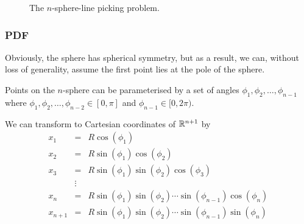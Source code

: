 \begin{figure}[tbp]
  \begin{center}
    \hspace{6mm}
    \caption{The $n$-sphere-line picking problem.}
  \end{center} 
\vspace{-4mm}
\end{figure}

\subsubsection{PDF}

Obviously, the sphere has spherical symmetry, but as a result, we can,
without loss of generality, assume the first point lies at the pole of
the sphere.

Points on the $n$-sphere can be parameterised by a set of angles
$\phi_1, \phi_2, \ldots, \phi_{n-1}$ where $\phi_1, \phi_2, \ldots,
\phi_{n-2}\in [0,\pi]$ and $\phi_{n-1}\in [0,2\pi)$. 


We can transform to Cartesian coordinates of $\mathbb{R}^{n+1}$ by
\begin{eqnarray}
  \label{eq:sphere_to_cart1}
  x_1 & = & R \cos (\phi_1 ) \\
  x_2 & = & R \sin(\phi_1) \cos (\phi_2 ) \\
  x_3 & = & R \sin(\phi_1) \sin(\phi_2) \cos (\phi_3 ) \\
      & \vdots & \\
  x_{n} & = & R \sin (\phi_1) \sin(\phi_2) \cdots \sin (\phi_{n-1}) \cos (\phi_{n})  \\
  x_{n+1} & = & R \sin (\phi_1) \sin(\phi_2) \cdots \sin (\phi_{n-1}) \sin (\phi_{n}) 
  \label{eq:sphere_to_cartn}
\end{eqnarray}

